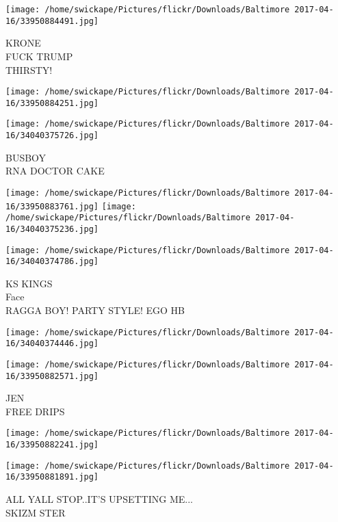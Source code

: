 \documentclass[10pt,letterpaper]{article}
\begin{document}
\vspace{0.25in}
\texttt{[image: /home/swickape/Pictures/flickr/Downloads/Baltimore 2017-04-16/33950884491.jpg]}

KRONE\\
FUCK TRUMP\\
THIRSTY!\\
\pagebreak

\texttt{[image: /home/swickape/Pictures/flickr/Downloads/Baltimore 2017-04-16/33950884251.jpg]}

\vspace{0.25in}
\texttt{[image: /home/swickape/Pictures/flickr/Downloads/Baltimore 2017-04-16/34040375726.jpg]}

BUSBOY\\
RNA DOCTOR CAKE\\
\pagebreak

\texttt{[image: /home/swickape/Pictures/flickr/Downloads/Baltimore 2017-04-16/33950883761.jpg]}
\texttt{[image: /home/swickape/Pictures/flickr/Downloads/Baltimore 2017-04-16/34040375236.jpg]}

\vspace{0.25in}
\texttt{[image: /home/swickape/Pictures/flickr/Downloads/Baltimore 2017-04-16/34040374786.jpg]}

KS KINGS\\
Face\\
RAGGA BOY!  PARTY STYLE!  EGO HB\\
\pagebreak

\texttt{[image: /home/swickape/Pictures/flickr/Downloads/Baltimore 2017-04-16/34040374446.jpg]}

\vspace{0.25in}
\texttt{[image: /home/swickape/Pictures/flickr/Downloads/Baltimore 2017-04-16/33950882571.jpg]}

JEN\\
FREE DRIPS\\
\pagebreak

\texttt{[image: /home/swickape/Pictures/flickr/Downloads/Baltimore 2017-04-16/33950882241.jpg]}

\vspace{0.25in}
\texttt{[image: /home/swickape/Pictures/flickr/Downloads/Baltimore 2017-04-16/33950881891.jpg]}

ALL YALL STOP..IT'S UPSETTING ME...\\
SKIZM STER\\
\pagebreak
\end{document}
